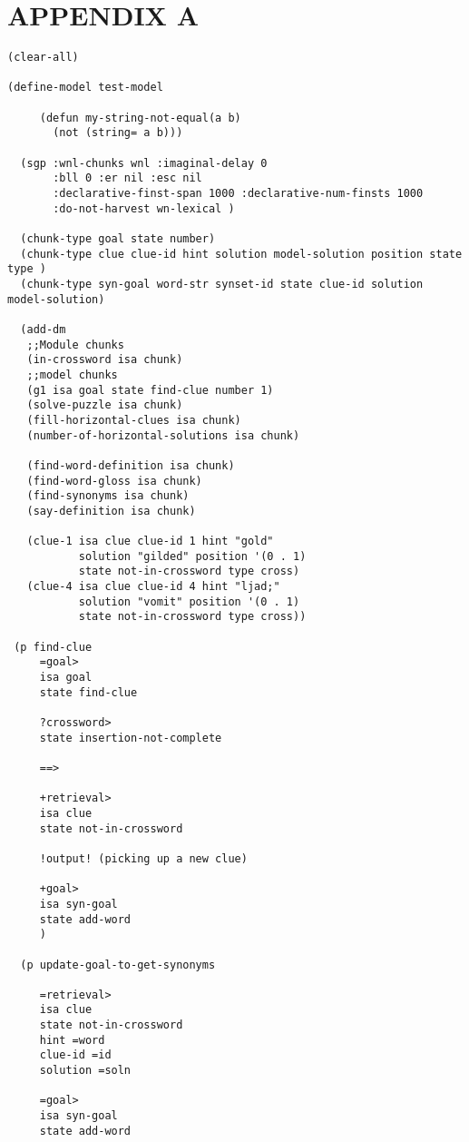 \headsep 0.8in
\section*{APPENDIX A}

\begin{verbatim}
(clear-all)

(define-model test-model

     (defun my-string-not-equal(a b)
       (not (string= a b)))

  (sgp :wnl-chunks wnl :imaginal-delay 0 
       :bll 0 :er nil :esc nil 
       :declarative-finst-span 1000 :declarative-num-finsts 1000 
       :do-not-harvest wn-lexical )
    
  (chunk-type goal state number)
  (chunk-type clue clue-id hint solution model-solution position state type )
  (chunk-type syn-goal word-str synset-id state clue-id solution model-solution)
  
  (add-dm
   ;;Module chunks
   (in-crossword isa chunk)
   ;;model chunks
   (g1 isa goal state find-clue number 1)
   (solve-puzzle isa chunk)
   (fill-horizontal-clues isa chunk)
   (number-of-horizontal-solutions isa chunk)

   (find-word-definition isa chunk)
   (find-word-gloss isa chunk)
   (find-synonyms isa chunk)
   (say-definition isa chunk)

   (clue-1 isa clue clue-id 1 hint "gold" 
           solution "gilded" position '(0 . 1) 
           state not-in-crossword type cross)
   (clue-4 isa clue clue-id 4 hint "ljad;" 
           solution "vomit" position '(0 . 1) 
           state not-in-crossword type cross))
 
 (p find-clue
     =goal>
     isa goal
     state find-clue

     ?crossword>
     state insertion-not-complete

     ==>

     +retrieval>
     isa clue
     state not-in-crossword

     !output! (picking up a new clue)

     +goal>
     isa syn-goal
     state add-word
     )

  (p update-goal-to-get-synonyms
     
     =retrieval>
     isa clue
     state not-in-crossword
     hint =word
     clue-id =id
     solution =soln

     =goal>
     isa syn-goal
     state add-word


\end{verbatim}
